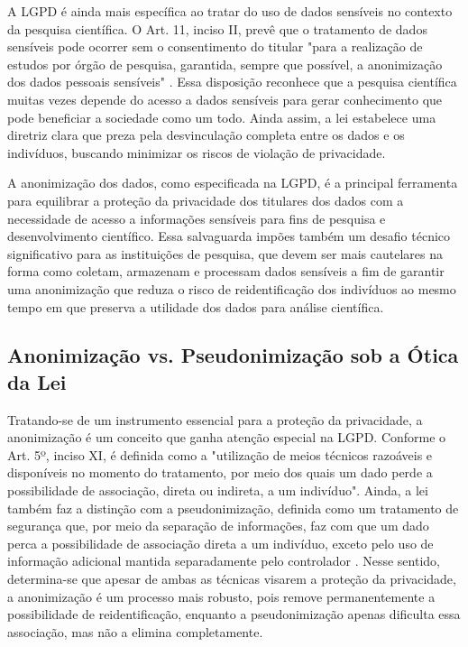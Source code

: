 A LGPD é ainda mais específica ao tratar do uso de dados sensíveis no contexto da pesquisa científica. O Art. 11, inciso II, prevê que o tratamento de dados sensíveis pode ocorrer sem o consentimento do titular "para a realização de estudos por órgão de pesquisa, garantida, sempre que possível, a anonimização dos dados pessoais sensíveis" \cite{Brasil2018lgpd}. Essa disposição reconhece que a pesquisa científica muitas vezes depende do acesso a dados sensíveis para gerar conhecimento que pode beneficiar a sociedade como um todo. Ainda assim, a lei estabelece uma diretriz clara que preza pela desvinculação completa entre os dados e os indivíduos, buscando minimizar os riscos de violação de privacidade.

A anonimização dos dados, como especificada na LGPD, é a principal ferramenta para equilibrar a proteção da privacidade dos titulares dos dados com a necessidade de acesso a informações sensíveis para fins de pesquisa e desenvolvimento científico. Essa salvaguarda impões também um desafio técnico significativo para as instituições de pesquisa, que devem ser mais cautelares na forma como coletam, armazenam e processam dados sensíveis a fim de garantir uma anonimização que reduza o risco de reidentificação dos indivíduos ao mesmo tempo em que preserva a utilidade dos dados para análise científica.

\subsection{Anonimização vs. Pseudonimização sob a Ótica da Lei}
\label{subsec:fund-anon-pseudo}

Tratando-se de um instrumento essencial para a proteção da privacidade, a anonimização é um conceito que ganha atenção especial na LGPD. Conforme o Art. 5º, inciso XI, é definida como a "utilização de meios técnicos razoáveis e disponíveis no momento do tratamento, por meio dos quais um dado perde a possibilidade de associação, direta ou indireta, a um indivíduo". Ainda, a lei também faz a distinção com a pseudonimização, definida como um tratamento de segurança que, por meio da separação de informações, faz com que um dado perca a possibilidade de associação direta a um indivíduo, exceto pelo uso de informação adicional mantida separadamente pelo controlador \cite[Art. 13, § 4º]{Brasil2018lgpd}. Nesse sentido, determina-se que apesar de ambas as técnicas visarem a proteção da privacidade, a anonimização é um processo mais robusto, pois remove permanentemente a possibilidade de reidentificação, enquanto a pseudonimização apenas dificulta essa associação, mas não a elimina completamente.

